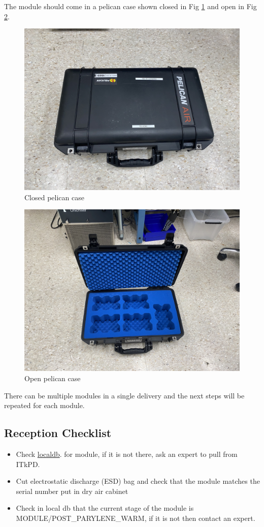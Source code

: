\documentclass[12pt]{article}
\begin{document}
The module should come in a pelican case shown closed in Fig \ref{fig:pelican-closed} and open in Fig \ref{fig:pelican-open}.

\begin{figure}[h]
    \centering
    \includegraphics[width=0.5\linewidth]{Figures/pelican_closed.jpg}
    \caption{Closed pelican case}
    \label{fig:pelican-closed}
\end{figure}
\begin{figure}[h]
    \centering
    \includegraphics[width=0.5\linewidth]{Figures/pelican_open.jpg}
    \caption{Open pelican case}
    \label{fig:pelican-open}
\end{figure}
There can be multiple modules in a single delivery and the next steps will be repeated for each module. 
\subsection{Reception Checklist}
\begin{itemize}
\item Check \hyperref[https://itkpix-srv.ucsc.edu/localdb/components?view=module]{localdb}. for module, if it is not there, ask an expert to pull from ITkPD.
\item Cut electrostatic discharge (ESD) bag and check that the module matches the serial number put in dry air cabinet %

\item Check in local db that the current stage of the module is MODULE/POST\_PARYLENE\_WARM, if it is not then contact an expert. 
\end{itemize}
\end{document}
